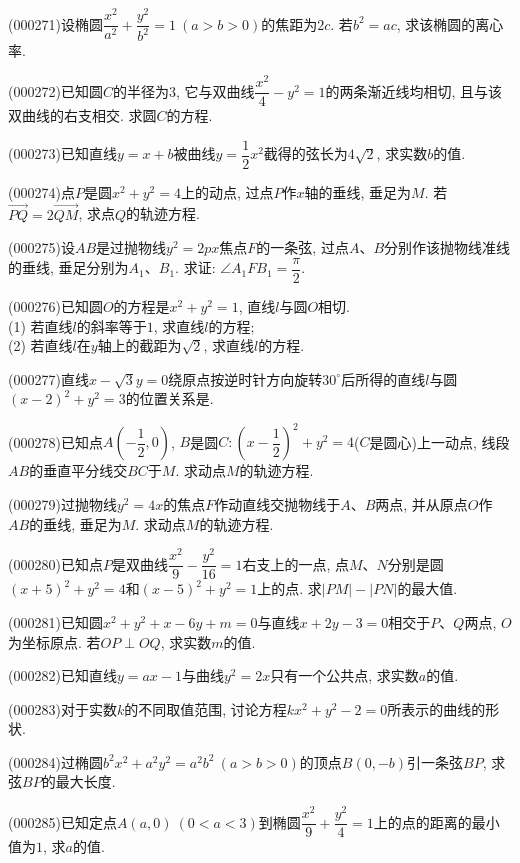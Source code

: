 \item (000271)设椭圆$\dfrac{x^2}{a^2}+\dfrac{y^2}{b^2}=1 \ (a>b>0)$的焦距为$2c$. 若$b^2=ac$, 求该椭圆的离心率.
\item (000272)已知圆$C$的半径为$3$, 它与双曲线$\dfrac{x^2}4-y^2=1$的两条渐近线均相切, 且与该双曲线的右支相交. 求圆$C$的方程.
\item (000273)已知直线$y=x+b$被曲线$y=\dfrac 12x^2$截得的弦长为$4\sqrt 2$, 求实数$b$的值.
\item (000274)点$P$是圆$x^2+y^2=4$上的动点, 过点$P$作$x$轴的垂线, 垂足为$M$. 若$\overrightarrow{PQ}=2\overrightarrow{QM}$, 求点$Q$的轨迹方程.
\item (000275)设$AB$是过抛物线$y^2=2px$焦点$F$的一条弦, 过点$A$、$B$分别作该抛物线准线的垂线, 垂足分别为$A_1$、$B_1$. 求证: $\angle A_1FB_1=\dfrac\pi 2$.
\item (000276)已知圆$O$的方程是$x^2+y^2=1$, 直线$l$与圆$O$相切.\\
(1) 若直线$l$的斜率等于$1$, 求直线$l$的方程;\\
(2) 若直线$l$在$y$轴上的截距为$\sqrt 2$, 求直线$l$的方程.
\item (000277)直线$x-\sqrt 3y=0$绕原点按逆时针方向旋转$30^\circ$后所得的直线$l$与圆$(x-2)^2+y^2=3$的位置关系是.
\item (000278)已知点$A(-\dfrac 12, 0)$, $B$是圆$C: (x-\dfrac 12)^2+y^2=4$($C$是圆心)上一动点, 线段$AB$的垂直平分线交$BC$于$M$. 求动点$M$的轨迹方程.
\item (000279)过抛物线$y^2=4x$的焦点$F$作动直线交抛物线于$A$、$B$两点, 并从原点$O$作$AB$的垂线, 垂足为$M$. 求动点$M$的轨迹方程.
\item (000280)已知点$P$是双曲线$\dfrac{x^2}9-\dfrac{y^2}{16}=1$右支上的一点, 点$M$、$N$分别是圆$(x+5)^2+y^2=4$和$(x-5)^2+y^2=1$上的点. 求$|PM|-|PN|$的最大值.
\item (000281)已知圆$x^2+y^2+x-6y+m=0$与直线$x+2y-3=0$相交于$P$、$Q$两点, $O$为坐标原点. 若$OP\perp OQ$, 求实数$m$的值.
\item (000282)已知直线$y=ax-1$与曲线$y^2=2x$只有一个公共点, 求实数$a$的值.
\item (000283)对于实数$k$的不同取值范围, 讨论方程$kx^2+y^2-2=0$所表示的曲线的形状.
\item (000284)过椭圆$b^2x^2+a^2y^2=a^2b^2 \ (a>b>0)$的顶点$B(0, -b)$引一条弦$BP$, 求弦$BP$的最大长度.
\item (000285)已知定点$A(a, 0) \ (0<a<3)$到椭圆$\dfrac{x^2}9+\dfrac{y^2}4=1$上的点的距离的最小值为$1$, 求$a$的值.
